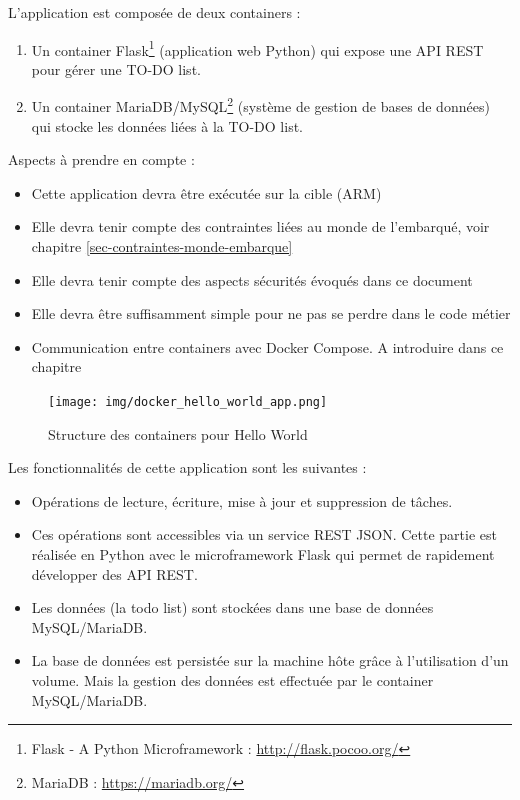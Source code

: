 \documentclass[11pt,a4paper,oneside]{report}
\begin{document}
L'application est composée de deux containers :
\begin{enumerate}
\item Un container Flask\footnote{Flask - A Python Microframework : \url{http://flask.pocoo.org/}} (application web Python) qui expose une API REST pour gérer une TO-DO list.
\item Un container MariaDB/MySQL\footnote{MariaDB : \url{https://mariadb.org/}} (système de gestion de bases de données) qui stocke les données liées à la TO-DO list.
\end{enumerate}

Aspects à prendre en compte :
\begin{itemize}
\item Cette application devra être exécutée sur la cible (ARM)
\item Elle devra tenir compte des contraintes liées au monde de l'embarqué, voir chapitre \ref{sec-contraintes-monde-embarque}
\item Elle devra tenir compte des aspects sécurités évoqués dans ce document
\item Elle devra être suffisamment simple pour ne pas se perdre dans le code métier
\item Communication entre containers avec Docker Compose. A introduire dans ce chapitre
\end{itemize}

\begin{figure}[H]
\centering
\texttt{[image: img/docker\_hello\_world\_app.png]}
\caption{Structure des containers pour Hello World}
\end{figure}


Les fonctionnalités de cette application sont les suivantes :
\begin{itemize}
\item Opérations de lecture, écriture, mise à jour et suppression de tâches.
\item Ces opérations sont accessibles via un service REST JSON. Cette partie est réalisée en Python avec le microframework Flask qui permet de rapidement développer des API REST.
\item Les données (la todo list) sont stockées dans une base de données MySQL/MariaDB.
\item La base de données est persistée sur la machine hôte grâce à l'utilisation d'un volume. Mais la gestion des données est effectuée par le container MySQL/MariaDB.
\end{itemize}


\newpage
\end{document}
